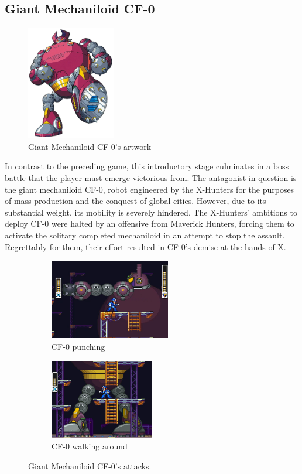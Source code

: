 \subsection{Giant Mechaniloid CF-0}
\begin{figure}[htp]
	\centering
	\includegraphics[height=5cm]{figures/X2/Enemies/CF0.png}
	\caption{Giant Mechaniloid CF-0's artwork}
\end{figure}
In contrast to the preceding game, this introductory stage culminates in a boss battle that the player must emerge victorious from. The antagonist in question is the giant mechaniloid CF-0, robot engineered by the X-Hunters for the purposes of mass production and the conquest of global cities. However, due to its substantial weight, its mobility is severely hindered. The X-Hunters' ambitions to deploy CF-0 were halted by an offensive from Maverick Hunters, forcing them to activate the solitary completed mechaniloid in an attempt to stop the assault. Regrettably for them, their effort resulted in CF-0's demise at the hands of X.
\begin{figure}[htp]
	\centering
	\begin{subfigure}{0.45\linewidth}
		\centering
		\includegraphics[height=3.5cm]{figures/X2/cf_punch.jpg}
		\caption{CF-0 punching}
	\end{subfigure}
	\begin{subfigure}{0.45\linewidth}
		\centering
		\includegraphics[height=3.5cm]{figures/X2/cf_walk.jpg}
		\caption{CF-0 walking around}
	\end{subfigure}
	\caption{Giant Mechaniloid CF-0's attacks.}
\end{figure}
